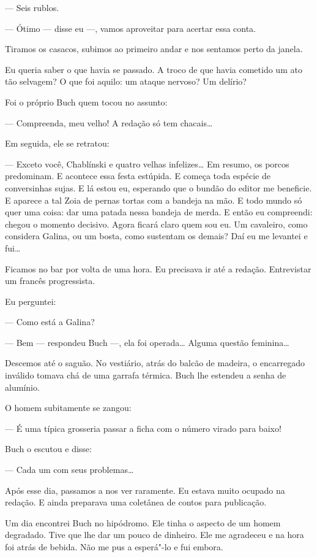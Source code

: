 --- Seis rublos.

--- Ótimo --- disse eu ---, vamos aproveitar para acertar essa conta.

Tiramos os casacos, subimos ao primeiro andar e nos sentamos perto da
janela.

Eu queria saber o que havia se passado. A troco de que havia
cometido um ato tão selvagem? O que foi aquilo: um ataque nervoso? Um
delírio?

Foi o próprio Buch quem tocou no assunto:

--- Compreenda, meu velho! A redação só tem chacais\ldots{}

Em seguida, ele se retratou:

--- Exceto você, Chablínski e quatro velhas infelizes\ldots{} Em resumo, os
porcos predominam. E acontece essa festa estúpida. E começa toda espécie
de conversinhas sujas. E lá estou eu, esperando que o bundão do editor
me beneficie. E aparece a tal Zoia de pernas tortas com a bandeja na
mão. E todo mundo só quer uma coisa: dar uma patada nessa bandeja de
merda. E então eu compreendi: chegou o momento decisivo. Agora ficará
claro quem sou eu. Um cavaleiro, como considera Galina, ou um bosta,
como sustentam os demais? Daí eu me levantei e fui\ldots{}

Ficamos no bar por volta de uma hora. Eu precisava ir até a redação.
Entrevistar um francês progressista.

Eu perguntei:

--- Como está a Galina?

--- Bem --- respondeu Buch ---, ela foi operada\ldots{} Alguma questão
feminina\ldots{}

Descemos até o saguão. No vestiário, atrás do balcão de madeira, o
encarregado inválido tomava chá de uma garrafa térmica. Buch lhe
estendeu a senha de alumínio.

O homem subitamente se zangou:

--- É uma típica grosseria passar a ficha com o número virado para
baixo!

Buch o escutou e disse:

--- Cada um com seus problemas\ldots{}

Após esse dia, passamos a nos ver raramente. Eu estava muito ocupado na
redação. E ainda preparava uma coletânea de contos para publicação.

Um dia encontrei Buch no hipódromo. Ele tinha o aspecto de um homem
degradado. Tive que lhe dar um pouco de dinheiro. Ele me agradeceu e na
hora foi atrás de bebida. Não me pus a esperá"-lo e fui embora.

